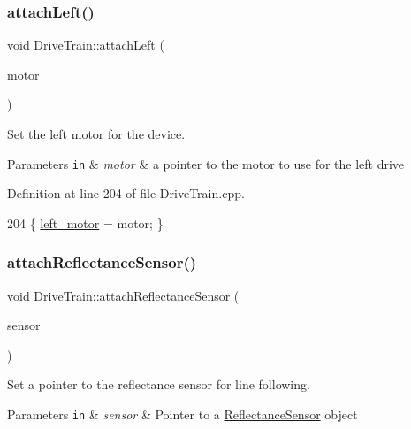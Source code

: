 \subsubsection{\texorpdfstring{attach\+Left()}{attachLeft()}}
{\footnotesize\ttfamily void Drive\+Train\+::attach\+Left (\begin{DoxyParamCaption}\item[{\hyperlink{class_pololu_motor}{Pololu\+Motor} $\ast$}]{motor }\end{DoxyParamCaption})}



Set the left motor for the device. 


\begin{DoxyParams}[1]{Parameters}
\mbox{\tt in}  & {\em motor} & a pointer to the motor to use for the left drive \\
\hline
\end{DoxyParams}


Definition at line 204 of file Drive\+Train.\+cpp.


\begin{DoxyCode}
204 \{ \hyperlink{class_drive_train_a9532e0208bfc16c308dafe08ba0e1087}{left\_motor} = motor; \}
\end{DoxyCode}
\mbox{\label{class_drive_train_a0d74765628d030fdd1ef0877a3750e03}} 
\subsubsection{\texorpdfstring{attach\+Reflectance\+Sensor()}{attachReflectanceSensor()}}
{\footnotesize\ttfamily void Drive\+Train\+::attach\+Reflectance\+Sensor (\begin{DoxyParamCaption}\item[{\hyperlink{class_reflectance_sensor}{Reflectance\+Sensor} $\ast$}]{sensor }\end{DoxyParamCaption})}



Set a pointer to the reflectance sensor for line following. 


\begin{DoxyParams}[1]{Parameters}
\mbox{\tt in}  & {\em sensor} & Pointer to a \hyperlink{class_reflectance_sensor}{Reflectance\+Sensor} object \\
\hline
\end{DoxyParams}


